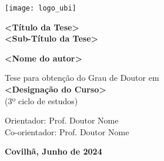\begin{titlepage}


\begin{flushright}
\texttt{[image: logo\_ubi]}\\


\vspace{7.6cm}

\rostotitulo \textbf{<Título da Tese>} \\
\rostosubtit \textbf{<Sub-Título da Tese>}\\

\vspace{1.8cm}

\rostonomes \textbf{<Nome do autor>}\\

\vspace{1.4cm}

\rostooutros Tese para obtenção do Grau de Doutor em\\
\rostonomes \textbf{<Designação do Curso>}\\
\rostooutros (3º ciclo de estudos)\\

\vspace{3.3cm}

\rostooutros Orientador: Prof. Doutor Nome\\
Co-orientador: Prof. Doutor Nome\\

\vspace{1.4cm}

\rostooutros \textbf{Covilhã, Junho de 2024}


\end{flushright}
\end{titlepage}

